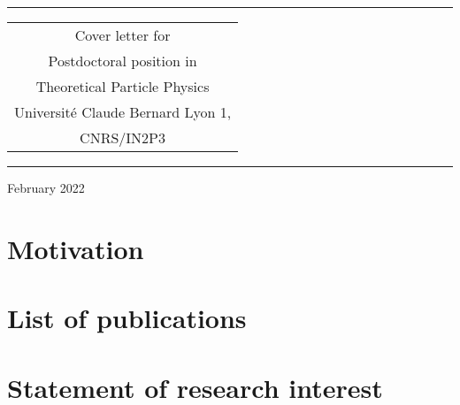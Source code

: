 \documentclass{cvf}
\begin{document}
\thispagestyle{empty}
\begin{center}

    \vspace{5cm}
    \par\noindent\rule[1ex]{\textwidth}{1.5pt}
    {\Huge \begin{tabular}{c}
Cover letter for                  \\[-0.5ex]
Postdoctoral position in          \\[-0.5ex]
Theoretical Particle Physics      \\[-0.5ex]
Université Claude Bernard Lyon 1, \\[-0.5ex]
CNRS/IN2P3
        \end{tabular} }
    \par\noindent\rule{\textwidth}{1.5pt}
    \vspace{2cm}
    \par{}
    \vfill
    February 2022
\end{center}



\setcounter{tocdepth}{1}
\tableofcontents

\chapter{Motivation}




\chapter{List of publications}


\chapter{Statement of research interest}

\end{document}
